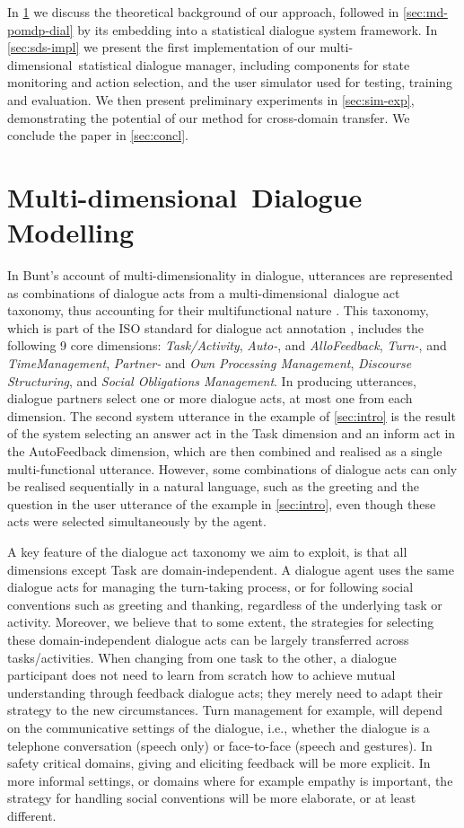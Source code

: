 \documentclass[11pt]{article}
\def\mdim{multi\hyp dimensional}
\def\Mdim{Multi\hyp dimensional}
\begin{document}
In \cref{sec:md-dial} we discuss the theoretical background of our approach, followed in \cref{sec:md-pomdp-dial} by its embedding into a statistical dialogue system framework.  In \cref{sec:sds-impl} we present the first implementation of our \mdim\ statistical dialogue manager, including components for state monitoring and action selection, and the user simulator used for testing, training and evaluation.  We then present preliminary experiments in \cref{sec:sim-exp}, demonstrating the potential of our method for cross-domain transfer.  We conclude the paper in \cref{sec:concl}.


\section{\Mdim\ Dialogue Modelling}\label{sec:md-dial}

In Bunt's account of multi-dimensionality in dialogue, utterances are represented as combinations of dialogue acts from a \mdim\ dialogue act taxonomy, thus accounting for their multifunctional nature \cite{Bunt:2011et}.  This taxonomy, which is part of the ISO standard for dialogue act annotation \cite{ISO-SemAnnot}, includes the following 9 core dimensions: \textsl{Task/Activity}, \textsl{Auto-}, and \textsl{AlloFeedback}, \textsl{Turn-}, and \textsl{TimeManagement}, \textsl{Partner-} and \textsl{Own Processing Management}, \textsl{Discourse Structuring}, and \textsl{Social Obligations Management}.  In producing utterances, dialogue partners select one or more dialogue acts, at most one from each dimension.  The second system utterance in the example of \cref{sec:intro} is the result of the system selecting an answer act in the Task dimension and an inform act in the AutoFeedback dimension, which are then combined and realised as a single multi-functional utterance.  However, some combinations of dialogue acts can only be realised sequentially in a natural language, such as the greeting and the question in the user utterance of the example in \cref{sec:intro}, even though these acts were selected simultaneously by the agent.

A key feature of the dialogue act taxonomy we aim to exploit, is that all dimensions except Task are domain-independent.  A dialogue agent uses the same dialogue acts for managing the turn-taking process, or for following social conventions such as greeting and thanking, regardless of the underlying task or activity.  Moreover, we believe that to some extent, the strategies for selecting these domain-independent dialogue acts can be largely transferred across tasks/activities.  When changing from one task to the other, a dialogue participant does not need to learn from scratch how to achieve mutual understanding through feedback dialogue acts; they merely need to adapt their strategy to the new circumstances.  Turn management for example, will depend on the communicative settings of the dialogue, i.e., whether the dialogue is a telephone conversation (speech only) or face-to-face (speech and gestures).  In safety critical domains, giving and eliciting feedback will be more explicit.  In more informal settings, or domains where for example empathy is important, the strategy for handling social conventions will be more elaborate, or at least different.  
\end{document}
